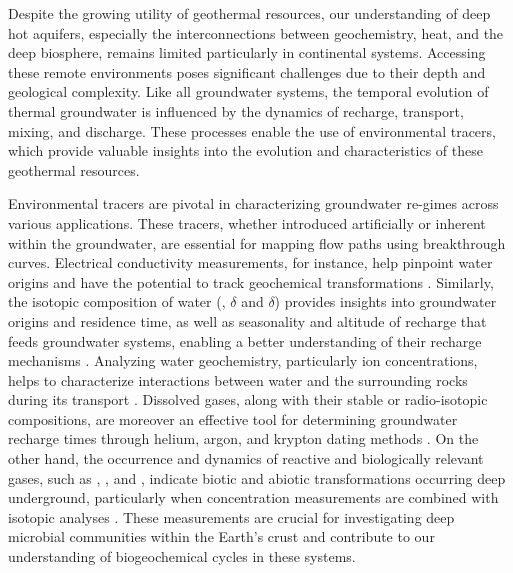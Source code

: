 Despite the growing utility of geothermal resources, our understanding of deep hot aquifers, especially the interconnections between geochemistry, heat, and the deep biosphere, remains limited particularly in continental systems. 
Accessing these remote environments poses significant challenges due to their depth and geological complexity. 
Like all groundwater systems, the temporal evolution of thermal groundwater is influenced by the dynamics of recharge, transport, mixing, and discharge. 
These processes enable the use of environmental tracers, which provide valuable insights into the evolution and characteristics of these geothermal resources.

Environmental tracers are pivotal in characterizing groundwater re-gimes across various applications.
These tracers, whether introduced artificially or inherent within the groundwater, are essential for mapping flow paths using breakthrough curves.
Electrical conductivity measurements, for instance, help pinpoint water origins \citep{plummer2000age} and have the potential to track geochemical transformations \citep{mengis1999multiple}.
Similarly, the isotopic composition of water (, $\delta$ and $\delta$) provides insights into groundwater origins and residence time, as well as seasonality and altitude of recharge that feeds groundwater systems, enabling a better understanding of their recharge mechanisms \citep{blasch2007distinguishing}.
Analyzing water geochemistry, particularly ion concentrations, helps to characterize interactions between water and the surrounding rocks during its transport \citep{elango2007rock}.
Dissolved gases, along with their stable or radio-isotopic compositions, are moreover an effective tool for determining groundwater recharge times through helium, argon, and krypton dating methods \citep{kipfer2002noble}.
On the other hand, the occurrence and dynamics of reactive and biologically relevant gases, such as , , and , indicate biotic and abiotic transformations occurring deep underground, particularly when concentration measurements are combined with isotopic analyses \citep{bottrell2019carbon, whiticar1999carbon}.
These measurements are crucial for investigating deep microbial communities within the Earth's crust and contribute to our understanding of biogeochemical cycles in these systems.

